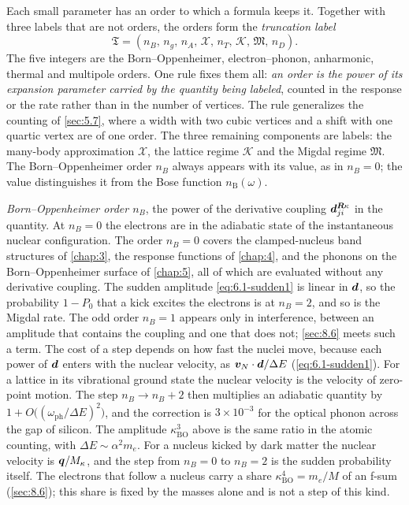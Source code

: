 Each small parameter has an order to which a formula keeps it. Together with three labels that are not orders, the orders form the \emph{truncation label}
\begin{equation}
  \mathfrak{T} = (n_B,\, n_g,\, n_A,\, \mathcal{X},\, n_T,\, \mathcal{K},\, \mathfrak{M},\, n_D) .
  \label{eq:8.5-label}
\end{equation}
The five integers are the Born--Oppenheimer, electron--phonon, anharmonic, thermal and multipole orders. One rule fixes them all: \emph{an order is the power of its expansion parameter carried by the quantity being labeled}, counted in the response or the rate rather than in the number of vertices. The rule generalizes the counting of \cref{sec:5.7}, where a width with two cubic vertices and a shift with one quartic vertex are of one order. The three remaining components are labels: the many-body approximation $\mathcal{X}$, the lattice regime $\mathcal{K}$ and the Migdal regime $\mathfrak{M}$. The Born--Oppenheimer order $n_B$ always appears with its value, as in $n_B = 0$; the value distinguishes it from the Bose function $n_{\mathrm{B}}(\omega)$.

\emph{Born--Oppenheimer order $n_B$}, the power of the derivative coupling $\bm{d}^{\bm{R}\kappa}_{ji}$ in the quantity. At $n_B = 0$ the electrons are in the adiabatic state of the instantaneous nuclear configuration. The order $n_B = 0$ covers the clamped-nucleus band structures of \cref{chap:3}, the response functions of \cref{chap:4}, and the phonons on the Born--Oppenheimer surface of \cref{chap:5}, all of which are evaluated without any derivative coupling. The sudden amplitude \cref{eq:6.1-sudden1} is linear in $\bm{d}$, so the probability $1 - P_0$ that a kick excites the electrons is at $n_B = 2$, and so is the Migdal rate. The odd order $n_B = 1$ appears only in interference, between an amplitude that contains the coupling and one that does not; \cref{sec:8.6} meets such a term. The cost of a step depends on how fast the nuclei move, because each power of $\bm{d}$ enters with the nuclear velocity, as $\bm{v}_N\cdot\bm{d}/\Delta E$ (\cref{eq:6.1-sudden1}). For a lattice in its vibrational ground state the nuclear velocity is the velocity of zero-point motion. The step $n_B \to n_B + 2$ then multiplies an adiabatic quantity by $1 + O\bigl((\omega_{\mathrm{ph}}/\Delta E)^2\bigr)$, and the correction is $3\times10^{-3}$ for the optical phonon across the gap of silicon. The amplitude $\kappa_{\mathrm{BO}}^3$ above is the same ratio in the atomic counting, with $\Delta E \sim \alpha^2m_e$. For a nucleus kicked by dark matter the nuclear velocity is $\bm{q}/M_\kappa$, and the step from $n_B = 0$ to $n_B = 2$ is the sudden probability itself. The electrons that follow a nucleus carry a share $\kappa_{\mathrm{BO}}^4 = m_e/M$ of an f-sum (\cref{sec:8.6}); this share is fixed by the masses alone and is not a step of this kind.

